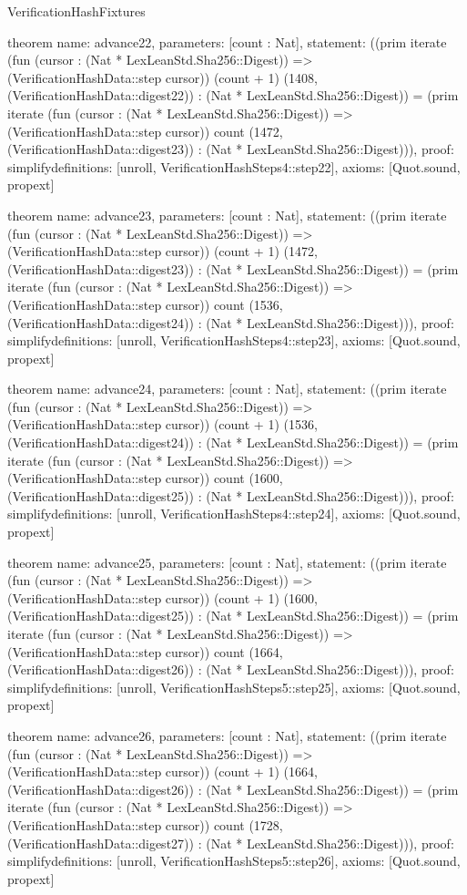 \begin{lexlean}{VerificationHashFixtures}
\begin{semanticmodule}
theorem{
  name: advance22,
  parameters: [count : Nat],
  statement: ((prim iterate (fun (cursor : (Nat * LexLeanStd.Sha256::Digest)) => (VerificationHashData::step cursor)) (count + 1) (1408, (VerificationHashData::digest22)) : (Nat * LexLeanStd.Sha256::Digest)) = (prim iterate (fun (cursor : (Nat * LexLeanStd.Sha256::Digest)) => (VerificationHashData::step cursor)) count (1472, (VerificationHashData::digest23)) : (Nat * LexLeanStd.Sha256::Digest))),
  proof: simplify{definitions: [unroll, VerificationHashSteps4::step22]},
  axioms: [Quot.sound, propext]
}

theorem{
  name: advance23,
  parameters: [count : Nat],
  statement: ((prim iterate (fun (cursor : (Nat * LexLeanStd.Sha256::Digest)) => (VerificationHashData::step cursor)) (count + 1) (1472, (VerificationHashData::digest23)) : (Nat * LexLeanStd.Sha256::Digest)) = (prim iterate (fun (cursor : (Nat * LexLeanStd.Sha256::Digest)) => (VerificationHashData::step cursor)) count (1536, (VerificationHashData::digest24)) : (Nat * LexLeanStd.Sha256::Digest))),
  proof: simplify{definitions: [unroll, VerificationHashSteps4::step23]},
  axioms: [Quot.sound, propext]
}

theorem{
  name: advance24,
  parameters: [count : Nat],
  statement: ((prim iterate (fun (cursor : (Nat * LexLeanStd.Sha256::Digest)) => (VerificationHashData::step cursor)) (count + 1) (1536, (VerificationHashData::digest24)) : (Nat * LexLeanStd.Sha256::Digest)) = (prim iterate (fun (cursor : (Nat * LexLeanStd.Sha256::Digest)) => (VerificationHashData::step cursor)) count (1600, (VerificationHashData::digest25)) : (Nat * LexLeanStd.Sha256::Digest))),
  proof: simplify{definitions: [unroll, VerificationHashSteps4::step24]},
  axioms: [Quot.sound, propext]
}

theorem{
  name: advance25,
  parameters: [count : Nat],
  statement: ((prim iterate (fun (cursor : (Nat * LexLeanStd.Sha256::Digest)) => (VerificationHashData::step cursor)) (count + 1) (1600, (VerificationHashData::digest25)) : (Nat * LexLeanStd.Sha256::Digest)) = (prim iterate (fun (cursor : (Nat * LexLeanStd.Sha256::Digest)) => (VerificationHashData::step cursor)) count (1664, (VerificationHashData::digest26)) : (Nat * LexLeanStd.Sha256::Digest))),
  proof: simplify{definitions: [unroll, VerificationHashSteps5::step25]},
  axioms: [Quot.sound, propext]
}

theorem{
  name: advance26,
  parameters: [count : Nat],
  statement: ((prim iterate (fun (cursor : (Nat * LexLeanStd.Sha256::Digest)) => (VerificationHashData::step cursor)) (count + 1) (1664, (VerificationHashData::digest26)) : (Nat * LexLeanStd.Sha256::Digest)) = (prim iterate (fun (cursor : (Nat * LexLeanStd.Sha256::Digest)) => (VerificationHashData::step cursor)) count (1728, (VerificationHashData::digest27)) : (Nat * LexLeanStd.Sha256::Digest))),
  proof: simplify{definitions: [unroll, VerificationHashSteps5::step26]},
  axioms: [Quot.sound, propext]
}


\end{semanticmodule}
\end{lexlean}
